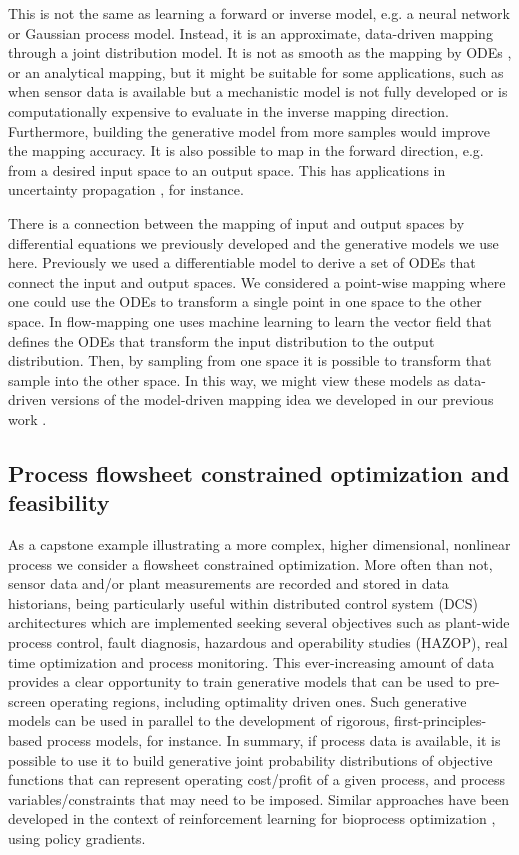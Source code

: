 \documentclass{achemso}
\begin{document}
This is not the same as learning a forward or inverse model, e.g. a neural network or Gaussian process model. Instead, it is an approximate, data-driven mapping through a joint distribution model. It is not as smooth as the mapping by ODEs \cite{alves-2023}, or an analytical mapping, but it might be suitable for some applications, such as when sensor data is available but a mechanistic model is not fully developed or is computationally expensive to evaluate in the inverse mapping direction. Furthermore, building the generative model from more samples would improve the mapping accuracy. It is also possible to map in the forward direction, e.g. from a desired input space to an output space. This has applications in uncertainty propagation \cite{alves-2025-mappin-uncer}, for instance.

There is a connection between the mapping of input and output spaces by differential equations we previously developed \cite{alves-2023} and the generative models we use here. Previously \cite{alves-2023} we used a differentiable model to derive a set of ODEs that connect the input and output spaces. We considered a point-wise mapping where one could use the ODEs to transform a single point in one space to the other space. In flow-mapping one uses machine learning to learn the vector field that defines the ODEs that transform the input distribution to the output distribution. Then, by sampling from one space it is possible to transform that sample into the other space. In this way, we might view these models as data-driven versions of the model-driven mapping idea we developed in our previous work \cite{alves-2023,alves-2025-mappin-uncer}.



\subsection{Process flowsheet constrained optimization and feasibility}

As a capstone example illustrating a more complex, higher dimensional, nonlinear process we consider a flowsheet constrained optimization. More often than not, sensor data and/or plant measurements are recorded and stored in data historians, being particularly useful within distributed control system (DCS) architectures which are implemented seeking several objectives such as plant-wide process control, fault diagnosis, hazardous and operability studies (HAZOP), real time optimization and process monitoring. This ever-increasing amount of data provides a clear opportunity to train generative models that can be used to pre-screen operating regions, including optimality driven ones. Such generative models can be used in parallel to the development of rigorous, first-principles-based process models, for instance. In summary, if process data is available, it is possible to use it to build generative joint probability distributions of objective functions that can represent operating cost/profit of a given process, and process variables/constraints that may need to be imposed. Similar approaches have been developed in the context of reinforcement learning for bioprocess optimization \cite{Petsagkourakis2020}, using policy gradients.
\end{document}
